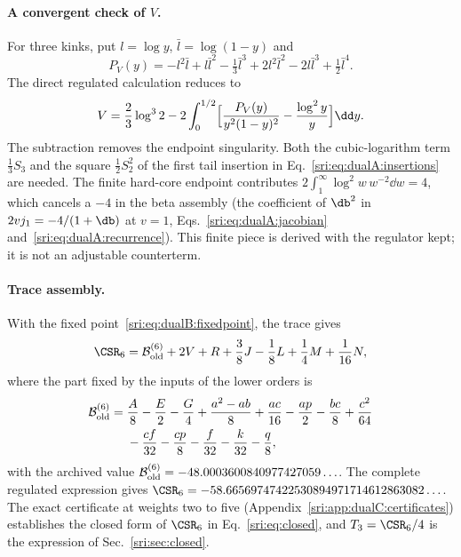 \paragraph{A convergent check of $V$.} For three kinks, put $l=\log y$, $\bar l=\log(1-y)$ and
\begin{equation}
 P_V(y)=-l^2\bar l+l\bar l^2-\tfrac13\bar l^3+2l^2\bar l^2-2l\bar l^3+\tfrac12\bar l^4.
\end{equation}
The direct regulated calculation reduces to
\begin{equation}
 V=\frac23\log^32-2\int_0^{1/2}\Bigl[\frac{P_V(y)}{y^2(1-y)^2}-\frac{\log^2y}{y}\Bigr]\dd y.
 \label{sri:eq:dualB:Vintegral}
\end{equation}
The subtraction removes the endpoint singularity. Both the cubic-logarithm term $\frac13S_3$ and the square
$\frac12S_2^2$ of the first tail insertion in Eq.~\eqref{sri:eq:dualA:insertions} are needed. The finite hard-core
endpoint contributes $2\int_1^\infty\log^2w\,w^{-2}\dd w=4$, which cancels a $-4$ in the beta assembly (the coefficient
of $\db^2$ in $2vj_1=-4/(1+\db)$ at $v=1$, Eqs.~\eqref{sri:eq:dualA:jacobian} and~\eqref{sri:eq:dualA:recurrence}). This
finite piece is derived with the regulator kept; it is not an adjustable counterterm.

\paragraph{Trace assembly.} With the fixed point~\eqref{sri:eq:dualB:fixedpoint}, the trace gives
\begin{equation}
 \CSR_6=\mathcal B^{(6)}_{\rm old}+2V+R+\frac38J-\frac18L+\frac14M+\frac1{16}N,
 \label{sri:eq:dualB:C6assembly}
\end{equation}
where the part fixed by the inputs of the lower orders is
\begin{equation}
\begin{aligned}
 \mathcal B^{(6)}_{\rm old}={}&\frac A8-\frac E2-\frac G4+\frac{a^2-ab}{8}+\frac{ac}{16}-\frac{ap}{2}-\frac{bc}{8}
 +\frac{c^2}{64}\\
 &-\frac{cf}{32}-\frac{cp}{8}-\frac f{32}-\frac k{32}-\frac q8,
\end{aligned}
\end{equation}
with the archived value $\mathcal B^{(6)}_{\rm old}=-48.0003600840977427059\ldots$. The complete regulated expression
gives $\CSR_6=-58.66569747422530894971714612863082\ldots$. The exact certificate at weights two to five (Appendix~\ref{sri:app:dualC:certificates}) establishes the closed form of $\CSR_6$ in Eq.~\eqref{sri:eq:closed}, and $T_3=\CSR_6/4$ is the
expression of Sec.~\ref{sri:sec:closed}.

